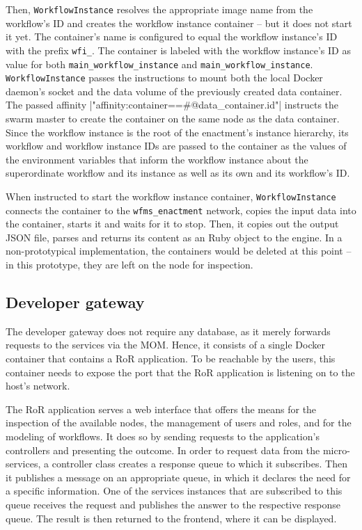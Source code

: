     Then, \texttt{WorkflowInstance} resolves the appropriate image name from the workflow's \ac{ID} and creates the workflow instance container -- but it does not start it yet. The container's name is configured to equal the workflow instance's \ac{ID} with the prefix \texttt{wfi\_}. The container is labeled with the workflow instance's \ac{ID} as value for both \texttt{main\_workflow\_instance} and \texttt{main\_workflow\_instance}. \texttt{WorkflowInstance} passes the instructions to mount both the local Docker daemon's socket and the data volume of the previously created data container. The passed affinity
    |"affinity:container==#{@data_container.id}"|
    instructs the swarm master to create the container on the same node as the data container. Since the workflow instance is the root of the enactment's instance hierarchy, its workflow and workflow instance \acp{ID} are passed to the container as the values of the environment variables that inform the workflow instance about the superordinate workflow and its instance as well as its own and its workflow's \ac{ID}.

    When instructed to start the workflow instance container, \texttt{WorkflowInstance} connects the container to the \texttt{wfms\_enactment} network, copies the input data into the container, starts it and waits for it to stop.
    Then, it copies out the output \ac{JSON} file, parses and returns its content as an Ruby object to the engine. In a non-prototypical implementation, the containers would be deleted at this point -- in this prototype, they are left on the node for inspection.

  \subsection{Developer gateway} %
    \label{sub:developer_gateway}
    The developer gateway does not require any database, as it merely forwards requests to the services via the \ac{MOM}. Hence, it consists of a single Docker container that contains a \ac{RoR} application. To be reachable by the users, this container needs to expose the port that the \ac{RoR} application is listening on to the host's network.

    The \ac{RoR} application serves a web interface that offers the means for the inspection of the available nodes, the management of users and roles, and for the modeling of workflows. It does so by sending requests to the application's controllers and presenting the outcome.
    In order to request data from the micro-services, a controller class creates a response queue to which it subscribes. Then it publishes a message on an appropriate queue, in which it declares the need for a specific information. One of the services instances that are subscribed to this queue receives the request and publishes the answer to the respective response queue. The result is then returned to the frontend, where it can be displayed.

